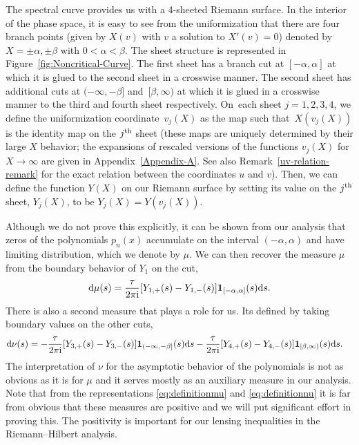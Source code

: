 \documentclass[pdftex]{sigma}
\numberwithin{equation}{section}
\begin{document}
 The spectral curve provides us with a 4-sheeted Riemann surface. In the interior of the phase space, it is easy to see from the uniformization that there are four branch points (given by $X(v)$ with $v$ a solution to $X'(v)=0$) denoted by $X=\pm \alpha, \pm \beta$ with $0<\alpha<\beta$. The sheet structure is represented in Figure~\ref{fig:Noncritical-Curve}. The first sheet has a branch cut at $[-\alpha,\alpha]$ at which it is glued to the second sheet in a crosswise manner. The second sheet has additional cuts at $(-\infty,-\beta]$ and~${[\beta,\infty)}$ at which it is glued in a crosswise manner to the third and fourth sheet respectively. On~each sheet $j=1,2,3,4$, we define the uniformization coordinate~$v_j(X)$ as the map such that~$X(v_j(X))$
 is the identity map on the $j^{\rm th}$ sheet (these maps are uniquely determined by their large $X$ behavior; the expansions of rescaled versions of the functions $v_j(X)$ for $X\to\infty$ are given in Appendix~\ref{Appendix-A}. See also Remark~\ref{uv-relation-remark} for the exact relation between the coordinates $u$ and $v$). Then, we can define the function $Y(X)$ on our Riemann surface
 by setting its value on the $j^{\rm th}$ sheet, $Y_j(X)$, to be $Y_j(X) = Y(v_j(X))$.

 Although we do not prove this explicitly, it can be shown from our analysis that zeros of the polynomials $p_n(x)$ accumulate on the interval $(-\alpha,\alpha)$ and have limiting distribution, which we denote by $\mu$. We can then recover the measure $\mu$ from the boundary behavior of $Y_1$ on the cut,
 \begin{equation} \label{eq:definitionmu}
 {\rm d}\mu(s) = \frac{\tau}{2\pi {\rm i}}[Y_{1,+}(s) - Y_{1,-}(s)]{\bf 1}_{[-\alpha,\alpha]}(s){\rm d}s.
 \end{equation}
 There is also a second measure that plays a role for us. Its defined by taking boundary values on the other cuts,
 \begin{align}\label{eq:definitionnu}
 &{\rm d}\nu(s)= -\frac{\tau}{2\pi {\rm i}}[Y_{3,+}(s) - Y_{3,-}(s)]{\bf 1}_{(-\infty,-\beta]}(s){\rm d}s -\frac{\tau}{2\pi {\rm i}}[Y_{4,+}(s) - Y_{4,-}(s)]{\bf 1}_{[\beta,\infty)}(s){\rm d}s.
 \end{align}
 The interpretation of $\nu$ for the asymptotic behavior of the polynomials is not as obvious as it is for $\mu$ and it serves mostly as an auxiliary measure in our analysis. Note that from the representations \eqref{eq:definitionmu} and \eqref{eq:definitionnu} it is far from obvious that these measures are positive and we will put significant effort in proving this. The positivity is important for our lensing inequalities in the Riemann--Hilbert analysis.
\end{document}
